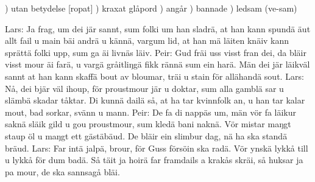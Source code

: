 \vspace{12mm}
\tabto{0.2cm}) \tabto{0.7cm}utan betydelse [ropat]
\tabto{0.2cm}) \tabto{0.7cm}kraxat glåpord
\tabto{0.2cm}) \tabto{0.7cm}angår
\tabto{0.2cm}) \tabto{0.7cm}bannade
\tabto{0.2cm}) \tabto{0.7cm}ledsam (\guillemotright{}ve-sam\guillemotright{})
\newpage
\begin{multicols}{2}
Lars: Ja frag, um dei jär sannt,
      sum folki um han sladrä,
      at han kann spundä äut
      allt fail u main bäi andrä
      u kännä, vargum lid,
      at han mä läiten knäiv
      kann sprättä folki upp,
      sum ga äi livnäs läiv.
Peir: Gud fräi uss visst fran dei,
      da bläir visst mour äi farä,
      u vargä gråitliŋgä
      fikk rännä sum ein harä.
      Män dei jär läikväl sannt
      at han kann skaffä bout
      av bloumar, träi u stain
      för allähandä sout.
Lars: Nå, dei bjär väl ihoup,
      för proustmour jär u doktar,
      sum alla gamblä sar
      u slämbä skadar tåktar.
      Di kunnä dailä så,
      at ha tar kvinnfolk an,
      u han tar kalar mout,
      bad sorkar, svänn u mann.
\vfill\columnbreak
Peir: De fa di nappäs um,
      män vör fa läikur saknä
      släik gild u gou proustmour,
      sum kledä bani naknä.
      Vör mistar maŋgt staup öl
      u maŋgt ett gästäbäud.
      De bläir ein slimbur dag,
      nä ha ska standä bräud.
Lars: Far intä jalpä, brour,
      för Guss försöin ska radä.
      Vör ynskä lykkå till
      u lykkå för dum badä.
      Så täit ja hoirä far
      framdails a krakås skräi,
      så huksar ja pa mour,
      de ska sannsagå bläi.
\end{multicols}

